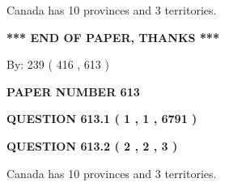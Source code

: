 \documentclass[12pt]{article}
\begin{document}
  
 
 
\noindent{}
 
 
Canada has 10  provinces and 3 territories.
 
 
 
 
   
   
 \vspace{0.2in}
 
   
   
   
   
\vspace{1.0in} 
{\textbf{\large{ *** END OF PAPER, THANKS *** }}} 
   
   
\hspace{1.0in} By: 
 239 ( 416 ,  613 )
   
   
   
   
\newpage 
\setcounter{page}{ 
   613001 } 
   
   
   
   
 {\textbf{ \Large{ PAPER NUMBER  613  }}}
   
   
\vspace{0.2in}
   
   
   
   
   
   
 \vspace{0.2in}
 
 
 
 
   
   
  
\vspace{0.2in}
  
{\textbf{\Large{QUESTION
613.1 
 ( 1 , 1 , 6791 )
}}}
  
  
  
\vspace{0.2in}
  
{\textbf{\Large{QUESTION
613.2 
 ( 2 , 2 , 3 )
}}}
  
  
 
 
\noindent{}
 
 
Canada has 10  provinces and 3 territories.
 
 
 
 
   
   
 \vspace{0.2in}
 
\end{document}
